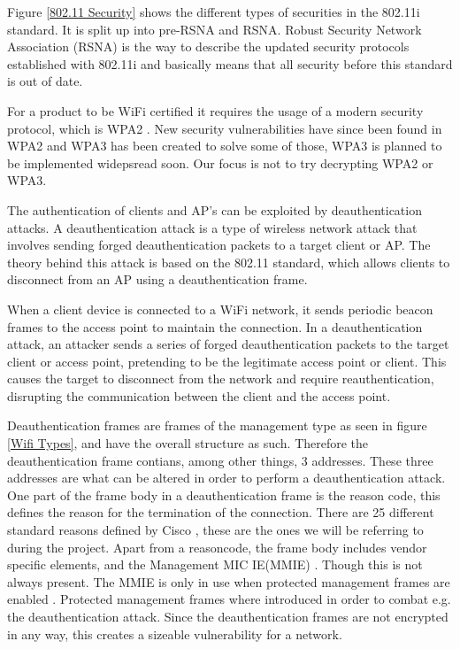 Figure \ref{802.11 Security} shows the different types of securities in the 802.11i standard. It is split up into pre-RSNA and RSNA. Robust
Security Network Association (RSNA) is the way to describe the updated security protocols established with 802.11i and basically means that all security before this standard is out of date. 

For a product to be WiFi certified it requires the usage of a modern security protocol, which is WPA2 \cite{WPA2_2}. New security vulnerabilities have since been found in WPA2 and WPA3 has been created to solve some of those, WPA3 is planned to be implemented widepsread soon. Our focus is not to try decrypting WPA2 or WPA3. 

The authentication of clients and AP's can be exploited by deauthentication attacks. A deauthentication attack is a type of wireless network attack that involves sending forged deauthentication packets to a target client or AP. The theory behind this attack is based on the 802.11 standard, which allows clients to disconnect from an AP using a deauthentication frame.

When a client device is connected to a WiFi network, it sends periodic beacon frames to the access point to maintain the connection. In a deauthentication attack, an attacker sends a series of forged deauthentication packets to the target client or access point, pretending to be the legitimate access point or client. This causes the target to disconnect from the network and require reauthentication, disrupting the communication between the client and the access point.

Deauthentication frames are frames of the management type as seen in figure \ref{Wifi Types}, and have the overall structure as such. Therefore the deauthentication frame contians, among other things, 3 addresses. These three addresses are what can be altered in order to perform a deauthentication attack. One part of the frame body in a deauthentication frame is the reason code, this defines the reason for the termination of the connection. There are 25 different standard reasons defined by Cisco \cite{Cisco_Deathentication_reasoncodes}, these are the ones we will be referring to during the project. Apart from a reasoncode, the frame body includes vendor specific elements, and the Management MIC IE(MMIE) \cite{IEEE_802.11w}. Though this is not always present. The MMIE is only in use when protected management frames are enabled \cite{IEEE_802.11w}. Protected management frames where introduced in order to combat e.g. the deauthentication attack. Since the deauthentication frames are not encrypted in any way, this creates a sizeable vulnerability for a network.

